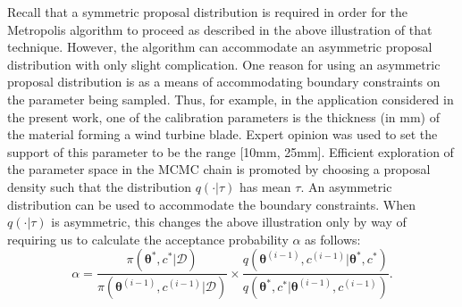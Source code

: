 \documentclass{article}
\begin{document}
Recall that a symmetric proposal distribution is required in order for the Metropolis algorithm to proceed as described in the above illustration of that technique. However, the algorithm can accommodate an asymmetric proposal distribution with only slight complication. One reason for using an asymmetric proposal distribution is as a means of accommodating boundary constraints on the parameter being sampled. Thus, for example, in the application considered in the present work, one of the calibration parameters is the thickness (in mm) of the material forming a wind turbine blade. Expert opinion was used to set the support of this parameter to be the range [10mm, 25mm]. Efficient exploration of the parameter space in the MCMC chain is promoted by choosing a proposal density such that the distribution $q(\cdot|\tau)$ has mean $\tau$. An asymmetric distribution can be used to accommodate the boundary constraints. When $q(\cdot|\tau)$ is asymmetric, this changes the above illustration only by way of requiring us to calculate the acceptance probability $\alpha$ as follows:
\begin{equation}\label{eq:mh_correction}
\alpha = \frac{\pi(\boldsymbol \theta^*,c^* | \mathcal D)}
{ \pi(\boldsymbol \theta^{(i-1)},c^{(i-1)}|\mathcal D) } \times 
\frac{
q(\boldsymbol \theta^{(i-1)},c^{(i-1)}|\boldsymbol \theta^*,c^*)
}{
q(\boldsymbol \theta^*,c^*|\boldsymbol \theta^{(i-1)},c^{(i-1)})
}.
\end{equation}

\end{document}
